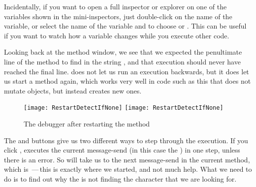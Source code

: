 \documentclass[a4paper,10pt,twoside]{book}
\begin{document}
Incidentally, if you want to open a full inspector or explorer on one of the variables shown in the mini-inspectors, just double-click on the name of the variable, or select the name of the variable and \actclick to choose  or .
This can be useful if you want to watch how a variable changes while you execute other code. 

Looking back at the method window, we see that we expected the penultimate line of the method to find  in the string , and that execution should never have reached the final line.
\pharo does not let us run an execution backwards, but it does let us start a method again, which works very well in code such as this that does not mutate objects, but instead creates new ones.  


\begin{figure}[btp]
	\begin{center}
	\ifluluelse
		{\texttt{[image: RestartDetectIfNone]}}
		{\texttt{[image: RestartDetectIfNone]}}
	\end{center}
	\caption{The debugger after restarting the  method}
\end{figure}

The  and  buttons give us two different ways to step through the execution.  If you click , \pharo executes the current message-send (in this case the ) in one step, unless there is an error.  
So  will take us to the next message-send in the current method, which is \,---\,this is exactly where we started, and not much help. 
What we need to do is to find out why the  is not finding the character that we are looking for.


\end{document}
